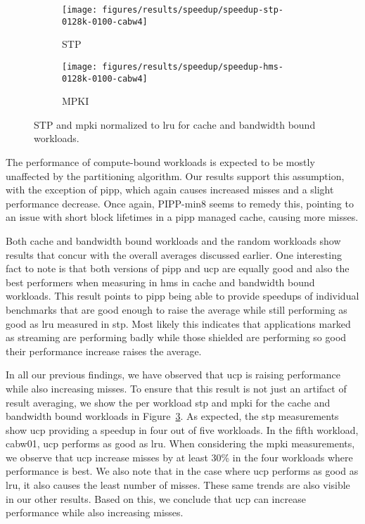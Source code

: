\begin{figure}[th]
    \centering
    \begin{subfigure}[b]{0.5\textwidth}
        \texttt{[image: figures/results/speedup/speedup-stp-0128k-0100-cabw4]}
        \caption{STP}
        \label{fig:results:base:cabw:stp}
    \end{subfigure}%
    \begin{subfigure}[b]{0.5\textwidth}
        \texttt{[image: figures/results/speedup/speedup-hms-0128k-0100-cabw4]}
        \caption{MPKI}
        \label{fig:results:base:cabw:mpki}
    \end{subfigure}
    \caption[cabw workloads result]{STP and \gls{mpki} normalized to \gls{lru} for cache and bandwidth bound workloads.}
    \label{fig:results:base:cabw} 
\end{figure}

The performance of compute-bound workloads is expected to be mostly unaffected by the partitioning algorithm. 
Our results support this assumption, with the exception of \gls{pipp}, which again causes increased misses and a slight performance decrease.
Once again, PIPP-min8 seems to remedy this, pointing to an issue with short block lifetimes in a \gls{pipp} managed cache, causing more misses.

Both cache and bandwidth bound workloads and the random workloads show results that concur with the overall averages discussed earlier.
One interesting fact to note is that both versions of \gls{pipp} and \gls{ucp} are equally good and also the best performers when measuring in \gls{hms} in cache and bandwidth bound workloads.
This result points to \gls{pipp} being able to provide speedups of individual benchmarks that are good enough to raise the average while still performing as good as \gls{lru} measured in \gls{stp}.
Most likely this indicates that applications marked as streaming are performing badly while those shielded are performing so good their performance increase raises the average.


In all our previous findings, we have observed that \gls{ucp} is raising performance while also increasing misses.
To ensure that this result is not just an artifact of result averaging, we show the per workload \gls{stp} and \gls{mpki} for the cache and bandwidth bound workloads in Figure~\ref{fig:results:base:cabw}.
As expected, the \gls{stp} measurements show \gls{ucp} providing a speedup in four out of five workloads.
In the fifth workload, cabw01, \gls{ucp} performs as good as \gls{lru}.
When considering the \gls{mpki} measurements, we observe that \gls{ucp} increase misses by at least 30\% in the four workloads where performance is best.
We also note that in the case where \gls{ucp} performs as good as \gls{lru}, it also causes the least number of misses.
These same trends are also visible in our other results.
Based on this, we conclude that \gls{ucp} can increase performance while also increasing misses.